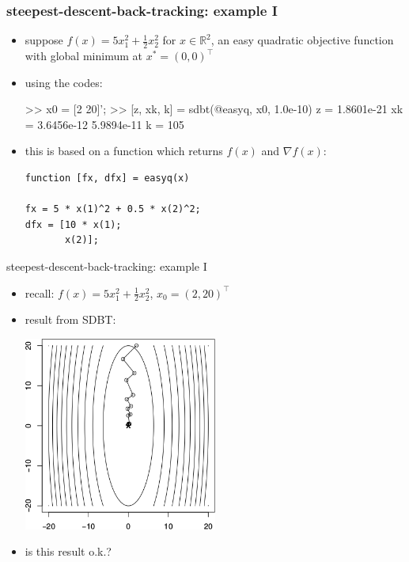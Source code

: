 \documentclass[10pt,hyperref]{beamer}
\newcommand{\grad}{\nabla}
\newcommand{\RR}{\mathbb{R}}
\begin{document}
\begin{frame}[fragile]
\frametitle{steepest-descent-back-tracking: example I}

\begin{itemize}
\item suppose $f(x) = 5 x_1^2 + \frac{1}{2} x_2^2$ for $x\in\RR^2$, an easy quadratic objective function with global minimum at $x^*=(0,0)^\top$
\item using the codes:
\begin{mVerb}
>> x0 = [2 20]';   %
>> [z, xk, k] = sdbt(@easyq, x0, 1.0e-10)
z = 1.8601e-21
xk =
   3.6456e-12
   5.9894e-11
k =   105
\end{mVerb}
\item this is based on a function which returns $f(x)$ and $\grad f(x)$:
\begin{Verbatim}[fontsize=\footnotesize]
function [fx, dfx] = easyq(x)

fx = 5 * x(1)^2 + 0.5 * x(2)^2;
dfx = [10 * x(1);
       x(2)];
\end{Verbatim}
\end{itemize}
\end{frame}


\begin{frame}{steepest-descent-back-tracking: example I}

\begin{itemize}
\item recall: $f(x) = 5 x_1^2 + \frac{1}{2} x_2^2$, $x_0=(2,20)^\top$
\item result from SDBT:

\begin{center}
\includegraphics[width=0.5\textwidth]{figs/egg-sd-backtracking}
\end{center}

\item is this result o.k.?
\end{itemize}
\end{frame}
\end{document}
